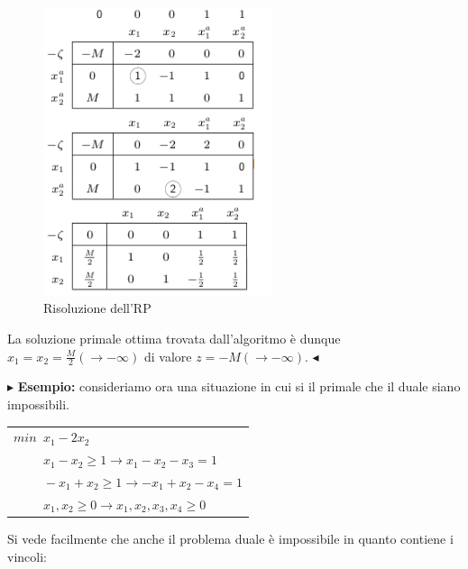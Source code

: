 \documentclass[11pt]{book}
\begin{document}
\begin{figure}[h!]
  \centering
  \includegraphics[width=0.6\textwidth]{images/cap5tab511.png}
  \caption{Risoluzione dell'RP}
  \label{cap5tab511}
\end{figure}

La soluzione primale ottima trovata dall'algoritmo \`e dunque $x_1 =
x_2 = \frac{M}{2} (\rightarrow -\infty)$ di valore $z = -M
(\rightarrow -\infty)$. $\blacktriangleleft$\vspace{11pt}


\vspace{11pt}$\blacktriangleright$ {\bf Esempio:} consideriamo ora una
situazione in cui si il primale che il duale siano impossibili. 

\vspace{11pt}
\begin{center}
\begin{tabular}{l}
$min\phantom{a}x_1 - 2x_2$ \\
$\phantom{mina}x_1-x_2 \geq 1 \rightarrow x_1 - x_2 - x_3 = 1$ \\
$\phantom{mina}-x_1 + x_2 \geq 1 \rightarrow -x_1 + x_2 - x_4 = 1$ \\
$\phantom{mina}x_1,x_2 \geq 0 \rightarrow x_1,x_2,x_3,x_4 \geq 0$ \\
\end{tabular}
\end{center}
\vspace{11pt}

Si vede facilmente che anche il problema duale \`e impossibile in
quanto contiene i vincoli:
\end{document}

